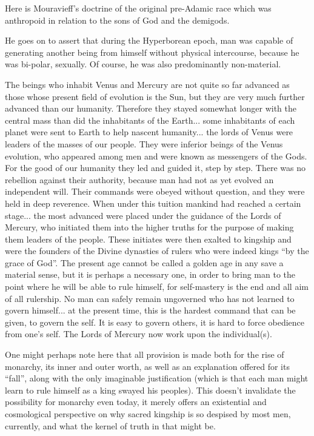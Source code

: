 Here is Mouravieff's doctrine of the original pre-Adamic race which was anthropoid in relation to the sons of God and the demigods.

He goes on to assert that during the Hyperborean epoch, man was capable of generating another being from himself without physical intercourse, because he was bi-polar, sexually. Of course, he was also predominantly non-material.

\begin{quotex}
The beings who inhabit Venus and Mercury are not quite so far advanced as those whose present field of evolution is the Sun, but they are very much further advanced than our humanity. Therefore they stayed somewhat longer with the central mass than did the inhabitants of the Earth... some inhabitants of each planet were sent to Earth to help nascent humanity... the lords of Venus were leaders of the masses of our people. They were inferior beings of the Venus evolution, who appeared among men and were known as messengers of the Gods. For the good of our humanity they led and guided it, step by step. There was no rebellion against their authority, because man had not as yet evolved an independent will. Their commands were obeyed without question, and they were held in deep reverence. When under this tuition mankind had reached a certain stage... the most advanced were placed under the guidance of the Lords of Mercury, who initiated them into the higher truths for the purpose of making them leaders of the people. These initiates were then exalted to kingship and were the founders of the Divine dynasties of rulers who were indeed kings ``by the grace of God''. The present age cannot be called a golden age in any save a material sense, but it is perhaps a necessary one, in order to bring man to the point where he will be able to rule himself, for self-mastery is the end and all aim of all rulership. No man can safely remain ungoverned who has not learned to govern himself... at the present time, this is the hardest command that can be given, to govern the self. It is easy to govern others, it is hard to force obedience from one's self. The Lords of Mercury now work upon the individual(s).
\end{quotex}


One might perhaps note here that all provision is made both for the rise of monarchy, its inner and outer worth, as well as an explanation offered for its ``fall'', along with the only imaginable justification (which is that each man might learn to rule himself as a king swayed his peoples). This doesn't invalidate the possibility for monarchy even today, it merely offers an existential and cosmological perspective on why sacred kingship is so despised by most men, currently, and what the kernel of truth in that might be.

